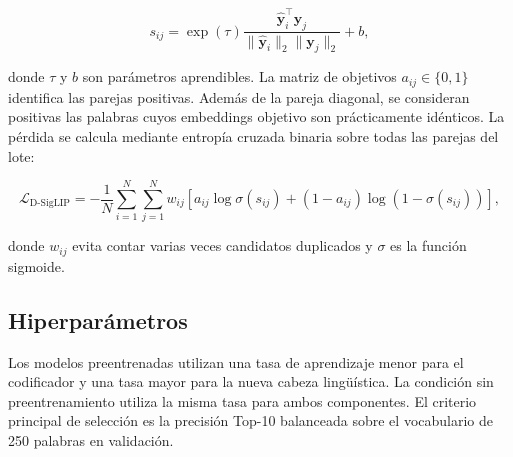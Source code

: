 \begin{equation}
s_{ij} =
\exp(\tau)
\frac{
\widehat{\mathbf{y}}_i^{\top}\mathbf{y}_j
}{
\|\widehat{\mathbf{y}}_i\|_2
\|\mathbf{y}_j\|_2
}
+b,
\end{equation}

\noindent donde \(\tau\) y \(b\) son parámetros aprendibles. La matriz de objetivos
\(a_{ij}\in\{0,1\}\) identifica las parejas positivas. Además de la pareja diagonal, se consideran positivas las palabras cuyos embeddings objetivo son prácticamente idénticos. La pérdida se calcula mediante entropía cruzada binaria sobre todas las parejas del lote:

\begin{equation}
\mathcal{L}_{\mathrm{D\text{-}SigLIP}} =
-\frac{1}{N}
\sum_{i=1}^{N}
\sum_{j=1}^{N}
w_{ij}
\left[
a_{ij}\log\sigma(s_{ij})
+
(1-a_{ij})\log\left(1-\sigma(s_{ij})\right)
\right],
\end{equation}

\noindent donde \(w_{ij}\) evita contar varias veces candidatos duplicados y
\(\sigma\) es la función sigmoide.

\subsection{Hiperparámetros}

Los modelos preentrenadas utilizan una tasa de aprendizaje menor para el codificador y una tasa mayor para la nueva cabeza lingüística. La condición sin preentrenamiento utiliza la misma tasa para ambos componentes. El criterio principal de selección es la precisión Top-10 balanceada sobre el vocabulario de 250 palabras en validación.

